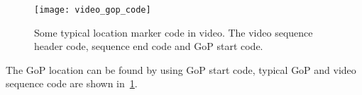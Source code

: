 \begin{figure}[!htbp]
  \centering
  \begin{minipage}{1.0\columnwidth}
  \texttt{[image: video\_gop\_code]}
  \end{minipage}
  
  \vspace{-1ex}
  \caption
    {
    \small
    Some typical location marker code in video. The video sequence header code,
    sequence end code and GoP start code. 
    }
  \label{fig:video_gop_code}
\end{figure}

The GoP location can be found by using GoP start code, typical GoP and video
sequence code are shown in~\fig\ref{fig:video_gop_code}. 




